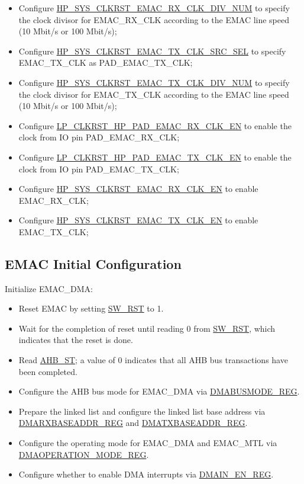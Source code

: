 \documentclass[main\_\_EN.tex]{subfiles}
\begin{document}
\begin{enumerate}
\begin{itemize}
\begin{itemize}
            \item Configure \hyperref[regdesc:HPSYSCLKRSTPERICLKCTRL01REG]{HP\_SYS\_CLKRST\_EMAC\_RX\_CLK\_DIV\_NUM} to specify the clock divisor for EMAC\_RX\_CLK according to the EMAC line speed (10 Mbit/s or 100 Mbit/s);
            \item Configure \hyperref[regdesc:HPSYSCLKRSTPERICLKCTRL01REG]{HP\_SYS\_CLKRST\_EMAC\_TX\_CLK\_SRC\_SEL} to specify EMAC\_TX\_CLK as PAD\_EMAC\_TX\_CLK;
            \item Configure \hyperref[regdesc:HPSYSCLKRSTPERICLKCTRL01REG]{HP\_SYS\_CLKRST\_EMAC\_TX\_CLK\_DIV\_NUM} to specify the clock divisor for EMAC\_TX\_CLK according to the EMAC line speed (10 Mbit/s or 100 Mbit/s);
            \item Configure \hyperref[fielddesc:LPCLKRSTHPPADEMACRXCLKEN]{LP\_CLKRST\_HP\_PAD\_EMAC\_RX\_CLK\_EN} to enable the clock from IO pin PAD\_EMAC\_RX\_CLK;
            \item Configure \hyperref[fielddesc:LPCLKRSTHPPADEMACTXCLKEN]{LP\_CLKRST\_HP\_PAD\_EMAC\_TX\_CLK\_EN} to enable the clock from IO pin PAD\_EMAC\_TX\_CLK;
            \item Configure \hyperref[regdesc:HPSYSCLKRSTSOCCLKCTRL1REG]{HP\_SYS\_CLKRST\_EMAC\_RX\_CLK\_EN} to enable EMAC\_RX\_CLK;
            \item Configure \hyperref[regdesc:HPSYSCLKRSTPERICLKCTRL01REG]{HP\_SYS\_CLKRST\_EMAC\_TX\_CLK\_EN} to enable EMAC\_TX\_CLK;
        \end{itemize}
\end{itemize}
\end{enumerate}

\subsection{EMAC Initial Configuration}

Initialize EMAC\_DMA:
\begin{itemize}
    \item Reset EMAC by setting \hyperref[regdesc:DMABUSMODEREG]{SW\_RST} to 1.
    \item Wait for the completion of reset until reading 0 from \hyperref[regdesc:DMABUSMODEREG]{SW\_RST}, which indicates  that the reset is done.
    \item Read \hyperref[regdesc:DMAHBSTATUSREG]{AHB\_ST}; a value of 0 indicates that all AHB bus transactions have been completed.
    \item Configure the AHB bus mode for EMAC\_DMA via \hyperref[regdesc:DMABUSMODEREG]{DMABUSMODE\_REG}.
    \item Prepare the linked list and configure the linked list base address via \hyperref[regdesc:DMARXBASEADDRREG]{DMARXBASEADDR\_REG} and \hyperref[regdesc:DMATXBASEADDRREG]{DMATXBASEADDR\_REG}.
    \item Configure the operating mode for EMAC\_DMA and EMAC\_MTL via \hyperref[regdesc:DMAOPERATIONMODEREG]{DMAOPERATION\_MODE\_REG}.
    \item Configure whether to enable DMA interrupts via \hyperref[regdesc:DMAINENREG]{DMAIN\_EN\_REG}.
\end{itemize}
\end{document}
